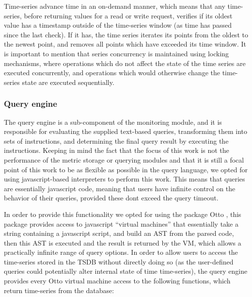 Time-series advance time in an on-demand manner, which means that any time-series, before returning values for a read or write request, verifies if its oldest value has a timestamp outside of the time-series window (as time has passed since the last check). If it has, the time series iterates its points from the oldest to the newest point, and removes all points which have exceeded its time window. It is important to mention that series concurrency is maintained using locking mechanisms, where operations which do not affect the state of the time series are executed concurrently, and operations which would otherwise change the time-series state are executed sequentially. 

\subsubsection{Query engine}

The query engine is a sub-component of the monitoring module, and it is responsible for evaluating the supplied text-based queries, transforming them into sets of instructions, and determining the final query result by executing the instructions. Keeping in mind the fact that the focus of this work is not the performance of the metric storage or querying modules and that it is still a focal point of this work to be as flexible as possible in the query language, we opted for using javascript-based interpreters to perform this work. This means that queries are essentially javascript code, meaning that users have infinite control on the behavior of their queries, provided these dont exceed the query timeout.

In order to provide this functionality we opted for using the package Otto , this package provides access to javascript ``virtual machines'' that essentially take a string containing a javascript script, and build an AST from the parsed code, then this AST is executed and the result is returned by the VM, which allows a practically infinite range of query options. In order to allow users to access the time-series stored in the TSDB without directly doing so (as the user-defined queries could potentially alter internal state of time time-series), the query engine provides every Otto virtual machine access to the following functions, which return time-series from the database:

